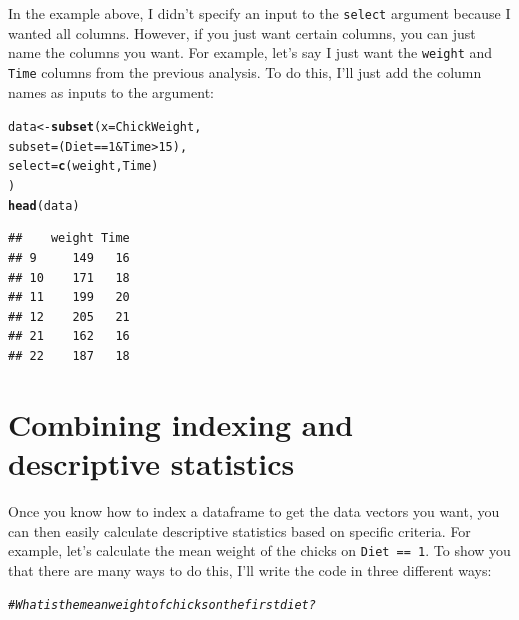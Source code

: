 \documentclass{tufte-book}\usepackage[]{graphicx}\usepackage[]{color}
\makeatletter
\newcommand{\hlnum}[1]{\textcolor[rgb]{0.686,0.059,0.569}{#1}}%
\newcommand{\hlcom}[1]{\textcolor[rgb]{0.678,0.584,0.686}{\textit{#1}}}%
\newcommand{\hlopt}[1]{\textcolor[rgb]{0,0,0}{#1}}%
\newcommand{\hlstd}[1]{\textcolor[rgb]{0.345,0.345,0.345}{#1}}%
\newcommand{\hlkwb}[1]{\textcolor[rgb]{0.69,0.353,0.396}{#1}}%
\newcommand{\hlkwc}[1]{\textcolor[rgb]{0.333,0.667,0.333}{#1}}%
\newcommand{\hlkwd}[1]{\textcolor[rgb]{0.737,0.353,0.396}{\textbf{#1}}}%
\newenvironment{kframe}{%
 \def\at@end@of@kframe{}%
 \ifinner\ifhmode%
  \def\at@end@of@kframe{\end{minipage}}%
  \begin{minipage}{\columnwidth}%
 \fi\fi%
 \def\FrameCommand##1{\hskip\@totalleftmargin \hskip-\fboxsep
 \colorbox{shadecolor}{##1}\hskip-\fboxsep
     \hskip-\linewidth \hskip-\@totalleftmargin \hskip\columnwidth}%
 \MakeFramed {\advance\hsize-\width
   \@totalleftmargin\z@ \linewidth\hsize
   \@setminipage}}%
 {\par\unskip\endMakeFramed%
 \at@end@of@kframe}
\newenvironment{knitrout}{}{} %
\makeatother
\begin{document}
\begin{footnotesize}
In the example above, I didn't specify an input to the \texttt{select} argument because I wanted all columns. However, if you just want certain columns, you can just name the columns you want. For example, let's say I just want the \texttt{weight} and \texttt{Time}
 columns from the previous analysis. To do this, I'll just add the column names as inputs to the  argument:
 
 \begin{footnotesize}
\begin{knitrout}
\color{fgcolor}\begin{kframe}
\begin{alltt}
\hlstd{data} \hlkwb{<-} \hlkwd{subset}\hlstd{(}\hlkwc{x} \hlstd{= ChickWeight,}
               \hlkwc{subset} \hlstd{= (Diet} \hlopt{==} \hlnum{1} \hlopt{&} \hlstd{Time} \hlopt{>} \hlnum{15}\hlstd{),}
               \hlkwc{select} \hlstd{=} \hlkwd{c}\hlstd{(weight, Time)}
               \hlstd{)}
\hlkwd{head}\hlstd{(data)}
\end{alltt}
\begin{verbatim}
##    weight Time
## 9     149   16
## 10    171   18
## 11    199   20
## 12    205   21
## 21    162   16
## 22    187   18
\end{verbatim}
\end{kframe}
\end{knitrout}
\end{footnotesize}
 
\section{Combining indexing and descriptive statistics}

Once you know how to index a dataframe to get the data vectors you want, you can then easily calculate descriptive statistics based on specific criteria. For example, let's calculate the mean weight of the chicks on \texttt{Diet == 1}. To show you that there are many ways to do this, I'll write the code in three different ways:

\begin{footnotesize}
\begin{knitrout}
\color{fgcolor}\begin{kframe}
\begin{alltt}
\hlcom{# What is the mean weight of chicks on the first diet?}


\end{alltt}
\end{kframe}
\end{knitrout}
\end{footnotesize}
\end{footnotesize}
\end{document}
